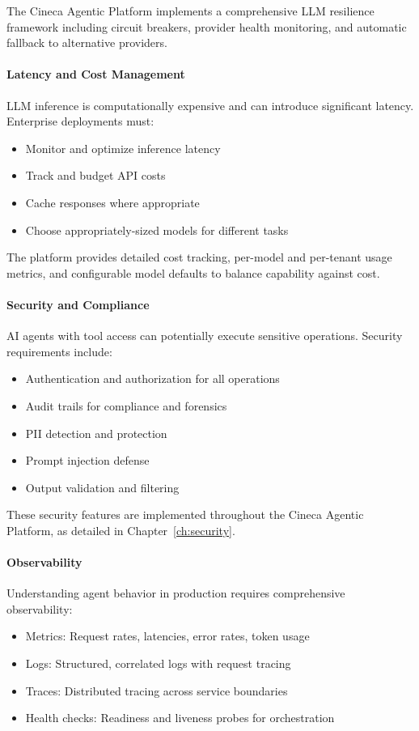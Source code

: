 \documentclass[a4paper,twoside]{sapthesis}
\begin{document}
The Cineca Agentic Platform implements a comprehensive LLM resilience framework including circuit breakers, provider health monitoring, and automatic fallback to alternative providers.

\paragraph{Latency and Cost Management}
LLM inference is computationally expensive and can introduce significant latency. Enterprise deployments must:
\begin{itemize}
    \item Monitor and optimize inference latency
    \item Track and budget API costs
    \item Cache responses where appropriate
    \item Choose appropriately-sized models for different tasks
\end{itemize}

The platform provides detailed cost tracking, per-model and per-tenant usage metrics, and configurable model defaults to balance capability against cost.

\paragraph{Security and Compliance}
AI agents with tool access can potentially execute sensitive operations. Security requirements include:
\begin{itemize}
    \item Authentication and authorization for all operations
    \item Audit trails for compliance and forensics
    \item PII detection and protection
    \item Prompt injection defense
    \item Output validation and filtering
\end{itemize}

These security features are implemented throughout the Cineca Agentic Platform, as detailed in Chapter~\ref{ch:security}.

\paragraph{Observability}
Understanding agent behavior in production requires comprehensive observability:
\begin{itemize}
    \item Metrics: Request rates, latencies, error rates, token usage
    \item Logs: Structured, correlated logs with request tracing
    \item Traces: Distributed tracing across service boundaries
    \item Health checks: Readiness and liveness probes for orchestration
\end{itemize}
\end{document}
